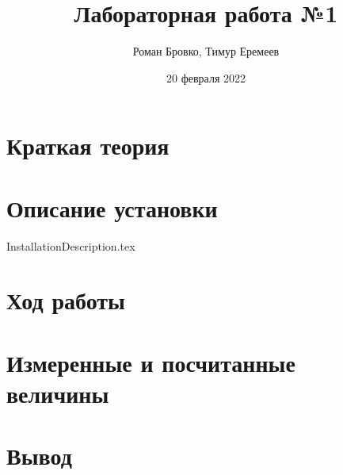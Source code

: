\documentclass[a4paper, 12pt]{article}
\begin{document}
        \title{Лабораторная работа №1}
	\author{Роман Бровко, Тимур Еремеев}
        \date{20 февраля 2022}

        \maketitle
        
        

        \section*{Краткая теория}
        

        \section*{Описание установки}
         {InstallationDescription.tex}

        \section*{Ход работы}
        

        \section*{Измеренные и посчитанные величины}
        

        \section*{Вывод}
        
\end{document}
